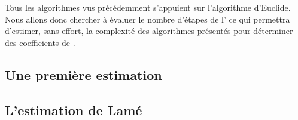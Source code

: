 Tous les algorithmes vus précédemment s'appuient sur l'algorithme d'Euclide. Nous allons donc chercher à évaluer le nombre d'étapes de l'\algoeucl{} ce qui permettra d'estimer, sans effort, la complexité des algorithmes présentés pour déterminer des coefficients de \bb.



\subsection{Une première estimation}





\subsection{L'estimation de Lamé}



